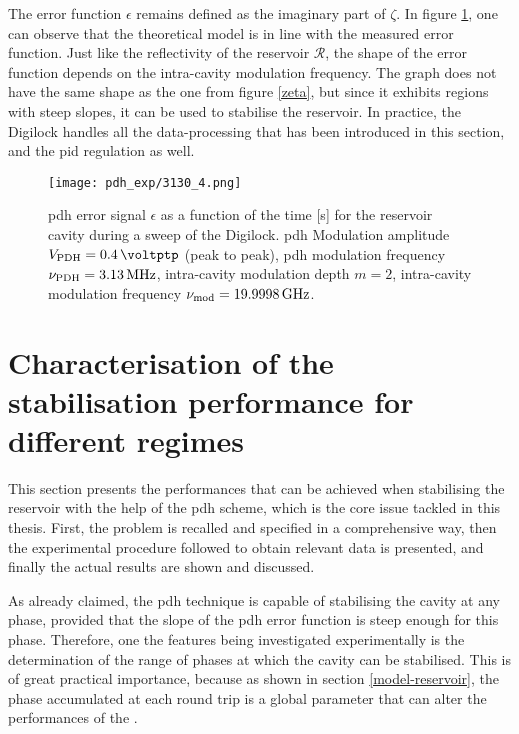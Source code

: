 The error function $\epsilon$ remains defined as the imaginary part of $\zeta$. In figure \ref{pdh_exp}, one can observe that the theoretical model is in line with the measured error function. Just like the reflectivity of the reservoir $\mathcal{R}$, the shape of the \pdh error function depends on the intra-cavity modulation frequency. The graph does not have the same shape as the one from figure \ref{zeta}, but since it exhibits regions with steep slopes, it can be used to stabilise the reservoir. In practice, the Digilock handles all the data-processing that has been introduced in this section, and the \gls{pid} regulation as well.

\begin{figure}
	\centering
	\texttt{[image: pdh\_exp/3130\_4.png]}
	\caption{\gls{pdh} error signal $\epsilon$ as a function of the time [s] for the reservoir cavity during a sweep of the Digilock. \gls{pdh} Modulation amplitude $\tind{V}{PDH}= \SI{0.4}{\voltptp}$ (peak to peak), \gls{pdh} modulation frequency $\nu_{\text{PDH}} = \SI{3.13}{\mega\hertz}$, intra-cavity modulation depth $m=2$, intra-cavity modulation frequency $\nu_{\text{mod}} = \SI{19.9998}{\giga\hertz}$.}
	\label{pdh_exp}
\end{figure}


\section{Characterisation of the stabilisation performance for different regimes}

This section presents the performances that can be achieved when stabilising the reservoir with the help of the \gls{pdh} scheme, which is the core issue tackled in this thesis. First, the problem is recalled and specified in a comprehensive way, then the experimental procedure followed to obtain relevant data is presented, and finally the actual results are shown and discussed.

As already claimed, the \gls{pdh} technique is capable of stabilising the cavity at any phase, provided that the slope of the \gls{pdh} error function is steep enough for this phase. Therefore, one the features being investigated experimentally is the determination of the range of phases at which the cavity can be stabilised. This is of great practical importance, because as shown in section \ref{model-reservoir}, the phase accumulated at each round trip is a global parameter that can alter the performances of the \rcer.\\

